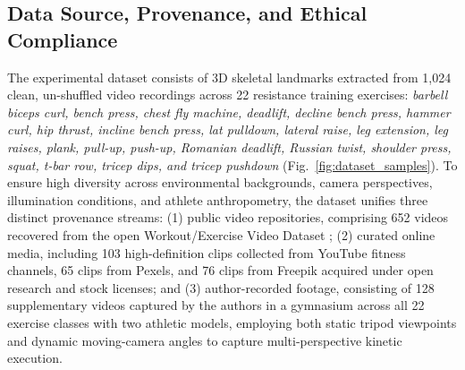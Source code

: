 \documentclass[preprint,12pt]{elsarticle}
\begin{document}
\subsection{Data Source, Provenance, and Ethical Compliance}
The experimental dataset consists of 3D skeletal landmarks extracted from 1,024 clean, un-shuffled video recordings across 22 resistance training exercises: \textit{barbell biceps curl, bench press, chest fly machine, deadlift, decline bench press, hammer curl, hip thrust, incline bench press, lat pulldown, lateral raise, leg extension, leg raises, plank, pull-up, push-up, Romanian deadlift, Russian twist, shoulder press, squat, t-bar row, tricep dips, and tricep pushdown} (Fig.~\ref{fig:dataset_samples}). 
To ensure high diversity across environmental backgrounds, camera perspectives, illumination conditions, and athlete anthropometry, the dataset unifies three distinct provenance streams: 
(1) public video repositories, comprising 652 videos recovered from the open Workout/Exercise Video Dataset \cite{abdillah2023}; 
(2) curated online media, including 103 high-definition clips collected from YouTube fitness channels, 65 clips from Pexels, and 76 clips from Freepik acquired under open research and stock licenses; 
and (3) author-recorded footage, consisting of 128 supplementary videos captured by the authors in a gymnasium across all 22 exercise classes with two athletic models, employing both static tripod viewpoints and dynamic moving-camera angles to capture multi-perspective kinetic execution.
\end{document}
